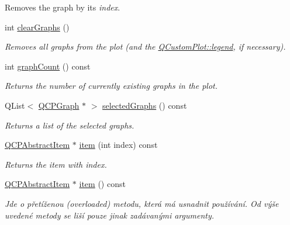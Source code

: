 \begin{DoxyCompactItemize}
\begin{DoxyCompactList}
Removes the graph by its {\itshape index}. \end{DoxyCompactList}\item 
int \hyperlink{classQCustomPlot_ab0f3abff2d2f7df3668b5836f39207fa}{clear\+Graphs} ()
\begin{DoxyCompactList}\small\item\em Removes all graphs from the plot (and the \hyperlink{classQCustomPlot_a4eadcd237dc6a09938b68b16877fa6af}{Q\+Custom\+Plot\+::legend}, if necessary). \end{DoxyCompactList}\item 
int \hyperlink{classQCustomPlot_a7d9b4d19114b2fde60f0233eeb0aa682}{graph\+Count} () const 
\begin{DoxyCompactList}\small\item\em Returns the number of currently existing graphs in the plot. \end{DoxyCompactList}\item 
Q\+List$<$ \hyperlink{classQCPGraph}{Q\+C\+P\+Graph} $\ast$ $>$ \hyperlink{classQCustomPlot_ad2a0493bdd01e7aa99a4209ae3a5b67b}{selected\+Graphs} () const 
\begin{DoxyCompactList}\small\item\em Returns a list of the selected graphs. \end{DoxyCompactList}\item 
\hyperlink{classQCPAbstractItem}{Q\+C\+P\+Abstract\+Item} $\ast$ \hyperlink{classQCustomPlot_a3e842b5a65b1d17fbb96cfb1fa1314d1}{item} (int index) const 
\begin{DoxyCompactList}\small\item\em Returns the item with {\itshape index}. \end{DoxyCompactList}\item 
\hyperlink{classQCPAbstractItem}{Q\+C\+P\+Abstract\+Item} $\ast$ \hyperlink{classQCustomPlot_a700399eae539798c5baf64a37c7f2135}{item} () const 
\begin{DoxyCompactList}\small\item\em Jde o přetíženou (overloaded) metodu, která má usnadnit používání. Od výše uvedené metody se liší pouze jinak zadávanými argumenty.


\end{DoxyCompactList}
\end{DoxyCompactItemize}
